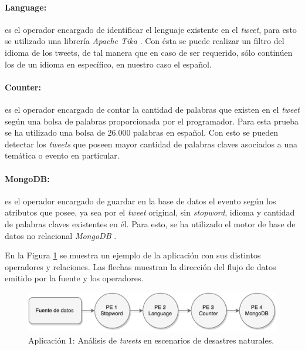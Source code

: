 \paragraph{Language:} es el operador encargado de identificar el lenguaje existente en el \textit{tweet}, para esto se utilizado una librer\'ia \textit{Apache Tika} \citep{mattmann2011tika}. Con \'esta se puede realizar un filtro del idioma de los tweets, de tal manera que en caso de ser requerido, s\'olo contin\'uen los de un idioma en espec\'ifico, en nuestro caso el espa\~nol.

\paragraph{Counter:} es el operador encargado de contar la cantidad de palabras que existen en el \textit{tweet} seg\'un una bolsa de palabras proporcionada por el programador. Para esta prueba se ha utilizado una bolsa de 26.000 palabras en espa\~nol. Con esto se pueden detectar los \textit{tweets} que poseen mayor cantidad de palabras claves asociados a una tem\'atica o evento en particular.

\paragraph{MongoDB:} es el operador encargado de guardar en la base de datos el evento seg\'un los atributos que posee, ya sea por el \textit{tweet} original, sin \textit{stopword}, idioma y cantidad de palabras claves existentes en \'el. Para esto, se ha utilizado el motor de base de datos no relacional \textit{MongoDB} \citep{chodorow2013mongodb}.

En la Figura \ref{fig:primeraAplicacion} se muestra un ejemplo de la aplicaci\'on con sus distintos operadores y relaciones. Las flechas muestran la direcci\'on del flujo de datos emitido por la fuente y los operadores.

\begin{figure}[!hb]
	\centering
		\includegraphics[scale=0.6]{images/App1.pdf}
	\caption{Aplicaci\'on 1: An\'alisis de \textit{tweets} en escenarios de desastres naturales.}
	\label{fig:primeraAplicacion}
\end{figure}

